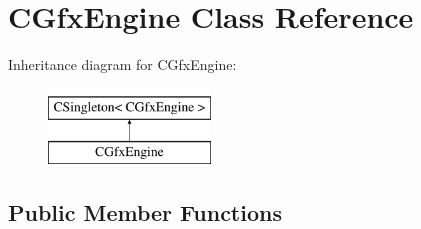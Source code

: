 \hypertarget{class_c_gfx_engine}{
\section{CGfxEngine Class Reference}
\label{class_c_gfx_engine}
}
Inheritance diagram for CGfxEngine:\begin{figure}[H]
\begin{center}
\leavevmode
\includegraphics[height=2cm]{class_c_gfx_engine}
\end{center}
\end{figure}
\subsection*{Public Member Functions}
